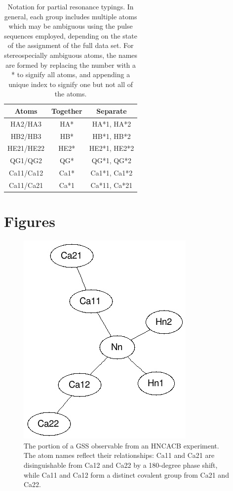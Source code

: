 \begin{table}
  \begin{tabular}{ | c | c | c |}
    \hline
    Atoms       &  Together &  Separate      \\  \hline 
    HA2/HA3     &  HA*      &  HA*1, HA*2    \\  \hline 
    HB2/HB3     &  HB*      &  HB*1, HB*2    \\  \hline 
    HE21/HE22   &  HE2*     &  HE2*1, HE2*2  \\  \hline 
    QG1/QG2     &  QG*      &  QG*1, QG*2    \\  \hline
    Ca11/Ca12   &  Ca1*     &  Ca1*1, Ca1*2  \\  \hline
    Ca11/Ca21   &  Ca*1     &  Ca*11, Ca*21  \\  \hline
  \end{tabular}
  \caption[Notation for partial resonance typings.]
          {Notation for partial resonance typings.
           In general, each group includes multiple atoms which may be 
           ambiguous using the pulse sequences employed, depending on the
           state of the assignment of the full data set.
           For stereospecially ambiguous atoms, the names are formed by
           replacing the number with a * to signify all atoms, and appending
           a unique index to signify one but not all of the atoms.}
  \label{partial_typing_notation}
\end{table}


\clearpage
\section{Figures}

\begin{figure}[h]
  \includegraphics[scale=0.75]{figures/generic_hncacb}
  \caption[The portion of a GSS observable from an HNCACB experiment.]
          {The portion of a GSS observable from an HNCACB experiment.
           The atom names reflect their relationships: Ca11 and Ca21 are
           disinguishable from Ca12 and Ca22 by a 180-degree phase shift,
           while Ca11 and Ca12 form a distinct covalent group from Ca21 and Ca22.}
  \label{generic_hncacb}
\end{figure}    

